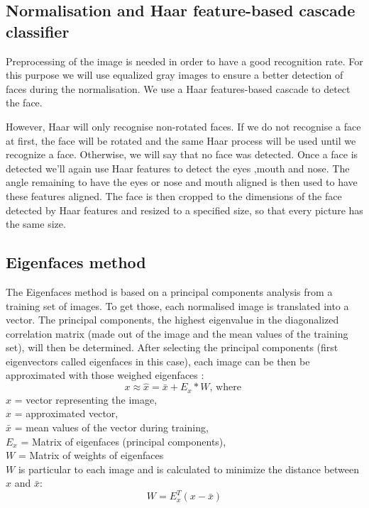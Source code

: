 \subsection{Normalisation and Haar feature-based cascade classifier}
Preprocessing of the image is needed in order to have a good recognition rate. For this purpose we will use equalized gray images to ensure a better detection of faces during the normalisation. We use a Haar features-based cascade to detect the face.

However, Haar will only recognise non-rotated faces. If we do not recognise a face at first, the face will be rotated and the same Haar process will be used until we recognize a face. Otherwise, we will say that no face was detected. Once a face is detected we'll again use Haar features to detect the eyes ,mouth and nose. The angle remaining to have the eyes or nose and mouth aligned is then used to have these features aligned. The face is then cropped to the dimensions of the face detected by Haar features and resized to a specified size, so that every picture has the same size.

\subsection{Eigenfaces method}

The Eigenfaces method is based on a principal components analysis from a training set of images. To get those, each normalised image is translated into a vector. The principal components, the highest eigenvalue in the diagonalized correlation matrix (made out of the image and the mean values of the training set), will then be determined. After selecting the principal components (first eigenvectors called eigenfaces in this case), each image can be then be approximated with those weighed eigenfaces :
\begin{equation}
x \approx  \hat{x} = \bar{x} + E_{x} * W \textrm{, where } 
\end{equation}
$x$ = vector representing the image,\\
$\hat{x}$ = approximated vector,\\
$\bar{x}$ = mean values of the vector during training,\\
$E_{x}$ = Matrix of eigenfaces (principal components),\\
$W$ = Matrix of weights of eigenfaces\\

$W$ is particular to each image and is calculated to minimize the distance between $x$ and $\bar{x}$:
\begin{equation}
W = E_{x}^T (x-\bar{x}) 
\end{equation}

